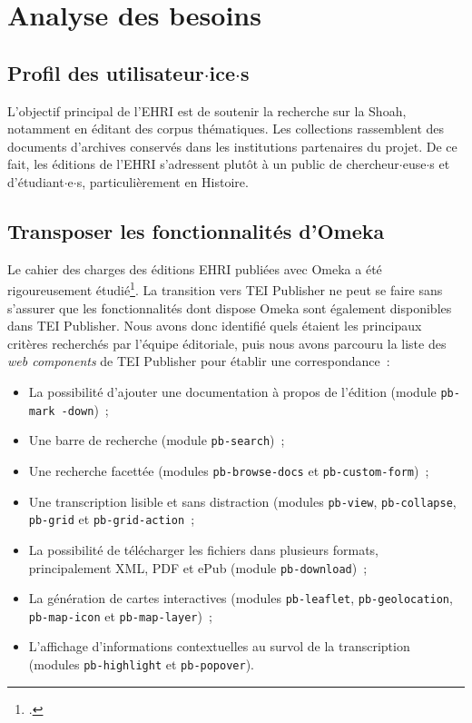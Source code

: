 
\section{Analyse des besoins}

\subsection{Profil des utilisateur$\cdot$ice$\cdot$s}
L'objectif principal de l'EHRI est de soutenir la recherche sur la Shoah, notamment en éditant des corpus thématiques. Les collections rassemblent des documents d'archives conservés dans les institutions partenaires du projet. De ce fait, les éditions de l'EHRI s'adressent plutôt à un public de chercheur$\cdot$euse$\cdot$s et d'étudiant$\cdot$e$\cdot$s, particulièrement en Histoire.


\subsection{Transposer les fonctionnalités d'Omeka}
Le cahier des charges des éditions EHRI publiées avec Omeka a été rigoureusement étudié\footcite{Ehri2018}. La transition vers TEI Publisher ne peut se faire sans s'assurer que les fonctionnalités dont dispose Omeka sont également disponibles dans TEI Publisher. Nous avons donc identifié quels étaient les principaux critères recherchés par l'équipe éditoriale, puis nous avons parcouru la liste des \textit{web components} de TEI Publisher pour établir une correspondance~:

\begin{itemize}
    \item La possibilité d'ajouter une documentation à propos de l'édition (module \texttt{pb-mark -down})~;
    \item Une barre de recherche (module \texttt{pb-search})~;
    \item Une recherche facettée (modules \texttt{pb-browse-docs} et \texttt{pb-custom-form})~;
    \item Une transcription lisible et sans distraction (modules \texttt{pb-view}, \texttt{pb-collapse}, \texttt{pb-grid} et \texttt{pb-grid-action}~;
    \item La possibilité de télécharger les fichiers dans plusieurs formats, principalement XML, PDF et ePub (module \texttt{pb-download})~;
    \item La génération de cartes interactives (modules \texttt{pb-leaflet}, \texttt{pb-geolocation}, \texttt{pb-map-icon} et \texttt{pb-map-layer})~;
    \item L'affichage d'informations contextuelles au survol de la transcription (modules \texttt{pb-highlight} et \texttt{pb-popover}).
\end{itemize}



